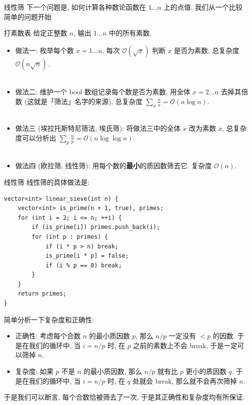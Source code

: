 \documentclass{beamer}
\newcommand{\nl}{\\\hspace*{\fill}\\}
\begin{document}
    \begin{frame}{线性筛}
        下一个问题是, 如何计算各种数论函数在 $1\dots n$ 上的点值. 我们从一个比较简单的问题开始
        \begin{block}{打素数表}
            给定正整数 $n$, 输出 $1\dots n$ 中的所有素数.
        \end{block}
        \pause
        \begin{itemize}
            \item 做法一: 枚举每个数 $x=1\dots n$, 每次 $\mathcal O(\sqrt x)$ 判断 $x$ 是否为素数, 总复杂度 $\mathcal O(n\sqrt n)$.\nl
            \item 做法二: 维护一个 bool 数组记录每个数是否为素数, 用全体 $x=2\dots n$ 去掉其倍数 (这就是「筛法」名字的来源), 总复杂度 $\sum_x\frac nx=\mathcal O(n\log n)$.\nl
            \item 做法三 (埃拉托斯特尼筛法, 埃氏筛): 将做法三中的全体 $x$ 改为素数 $x$, 总复杂度可以分析出 $\sum_p\frac np=\mathcal O(n\log\log n)$.\nl
            \item 做法四 (欧拉筛, 线性筛): 用每个数的\textbf{最小}的质因数筛去它. 复杂度 $\mathcal O(n)$.
        \end{itemize}
    \end{frame}

    \begin{frame}[fragile]{线性筛}
        线性筛的具体做法是:
        \begin{lstlisting}
vector<int> linear_sieve(int n) {
    vector<int> is_prime(n + 1, true), primes;
    for (int i = 2; i <= n; ++i) {
        if (is_prime[i]) primes.push_back(i);
        for (int p : primes) {
            if (i * p > n) break;
            is_prime[i * p] = false;
            if (i % p == 0) break;
        }
    }
    return primes;
}\end{lstlisting}
        简单分析一下复杂度和正确性:
        \begin{itemize}
            \item 正确性: 考虑每个合数 $n$ 的最小质因数 $p$, 那么 $n/p$ 一定没有 $<p$ 的因数. 于是在我们的循环中, 当 $i=n/p$ 时, 在 $p$ 之前的素数上不会 break, 于是一定可以筛掉 $n$.
            \item 复杂度: 如果 $p$ 不是 $n$ 的最小质因数, 那么 $n/p$ 就有比 $p$ 更小的质因数 $q$. 于是在我们的循环中, 当 $i=n/p$ 时, 在 $q$ 处就会 break, 那么就不会再次筛掉 $n$.
        \end{itemize}
        于是我们可以断言, 每个合数恰被筛去了一次, 于是其正确性和复杂度均有所保证.\nl
    \end{frame}
\end{document}
